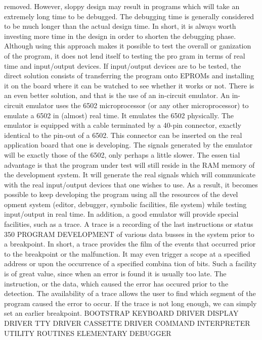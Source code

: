 \documentclass{book}
\begin{document}
{{{{{{{{{{{{{{{{{{{{{{{{{{{{{{{{{{{{{{{{{{{{{{{{{{{{{{{{{{{{{{{{{{{{{{{{{{{{{{{{{{{{{{{{{{{{{{{{{{{{{{{{{{{{{{{{{{{{{{{{{{{{{{{{{{{{{{{{{{{{removed. However, sloppy design may result in programs which
will take an extremely long time to be debugged. The debugging
time is generally considered to be much longer than the actual
design time. In short, it is always worth investing more time in
the design in order to shorten the debugging phase.
Although using this approach makes it possible to test the overall or
ganization of the program, it does not lend itself to testing the pro
gram in terms of real time and input/output devices. If input/output
devices are to be tested, the direct solution consists of transferring the
program onto EPROMs and installing it on the board where it can
be watched to see whether it works or not.
There is an even better solution, and that is the use of an in-circuit
emulator. An in-circuit emulator uses the 6502 microprocessor (or
any other microprocessor) to emulate a 6502 in (almost) real time. It
emulates the 6502 physically. The emulator is equipped with a cable
terminated by a 40-pin connector, exactly identical to the pin-out of a
6502. This connector can be inserted on the real application board that one
is developing. The signals generated by the emulator will be
exactly those of the 6502, only perhaps a little slower. The essen
tial advantage is that the program under test will still reside in
the RAM memory of the development system. It will generate the
real signals which will communicate with the real input/output
devices that one wishes to use. As a result, it becomes possible to
keep developing the program using all the resources of the devel
opment system (editor, debugger, symbolic facilities, file system)
while testing input/output in real time.
In addition, a good emulator will provide special facilities, such
as a trace. A trace is a recording of the last instructions or status
350
PROGRAM DEVELOPMENT
of various data busses in the system prior to a breakpoint. In
short, a trace provides the film of the events that occurred prior to
the breakpoint or the malfunction. It may even trigger a scope at
a specified address or upon the occurrence of a specified combina
tion of bits. Such a facility is of great value, since when an error is
found it is usually too late. The instruction, or the data, which
caused the error has occured prior to the detection. The availability
of a trace allows the user to find which segment of the program
caused the error to occur. If the trace is not long enough, we can
simply set an earlier breakpoint.
BOOTSTRAP
KEYBOARD
DRIVER
DISPLAY
DRIVER
TTY
DRIVER
CASSETTE
DRIVER
COMMAND
INTERPRETER
UTILITY
ROUTINES
ELEMENTARY
DEBUGGER
}}}}}}}}}}}}}}}}}}}}}}}}}}}}}}}}}}}}}}}}}}}}}}}}}}}}}}}}}}}}}}}}}}}}}}}}}}}}}}}}}}}}}}}}}}}}}}}}}}}}}}}}}}}}}}}}}}}}}}}}}}}}}}}}}}}}}}}}}}}}
\end{document}
